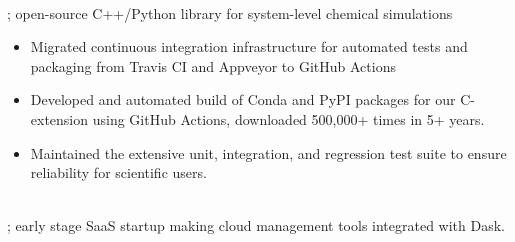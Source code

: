 \\
 ; open-source C++/Python library for system-level chemical simulations

\begin{itemize}
\item Migrated continuous integration infrastructure for automated tests and packaging from Travis CI and Appveyor to GitHub Actions
\item Developed and automated build of Conda and PyPI packages for our C-extension using GitHub Actions, downloaded 500,000+ times in 5+ years.
\item Maintained the extensive unit, integration, and regression test suite to ensure reliability for scientific users.
\end{itemize}
\sectionsep

\\
; early stage SaaS startup making cloud management tools integrated with Dask.

